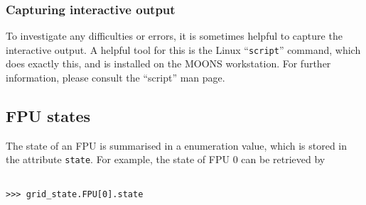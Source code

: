\documentclass{scrartcl}[12pt,a4paper]
\begin{document}
\subsubsection*{Capturing interactive output}

To investigate any difficulties or errors, it is sometimes helpful to
capture the interactive output. A helpful tool for this is the Linux
``\texttt{script}'' command, which does exactly this, and is installed
on the MOONS workstation.  For further information, please consult the
``script'' man page.



\subsection{FPU states}
The state of an FPU is summarised in a enumeration value, which is
stored in the attribute \texttt{state}. For example, the state of FPU 0
can be retrieved by

\begin{verbatim}

>>> grid_state.FPU[0].state
\end{verbatim}
\end{document}
